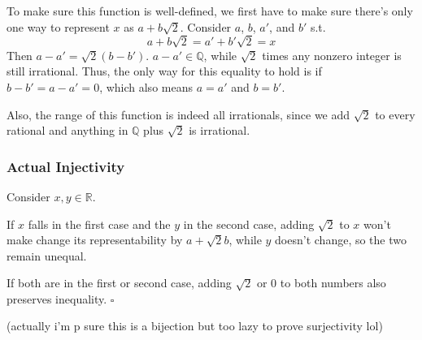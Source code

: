 \documentclass[12pt]{article}
\newcommand{\R}{\mathbb{R}}
\newcommand{\Q}{\mathbb{Q}}
\begin{document}
To make sure this function is well-defined, we first have to make
sure there's only one way to represent $x$ as $a+b\sqrt{2}$.
Consider $a$, $b$, $a'$, and $b'$ s.t.
\[a+b\sqrt{2}=a'+b'\sqrt{2}=x\]
Then $a-a'=\sqrt{2}(b-b')$.
$a-a' \in \Q$, while $\sqrt{2}$ times any nonzero integer is still irrational.
Thus, the only way for this equality to hold is if $b-b'=a-a'=0$,
which also means $a=a'$ and $b=b'$.

Also, the range of this function is indeed all irrationals,
since we add $\sqrt{2}$ to every rational and anything in $\Q$ plus $\sqrt{2}$
is irrational.

\subsubsection{Actual Injectivity}

Consider $x, y \in \R$.

If $x$ falls in the first case and the $y$ in the second case,
adding $\sqrt{2}$ to $x$ won't make change its representability by $a+\sqrt{2}b$,
while $y$ doesn't change, so the two remain unequal.

If both are in the first or second case, adding $\sqrt{2}$ or $0$
to both numbers also preserves inequality. $\square$

(actually i'm p sure this is a bijection but too lazy to prove surjectivity lol)
\end{document}
